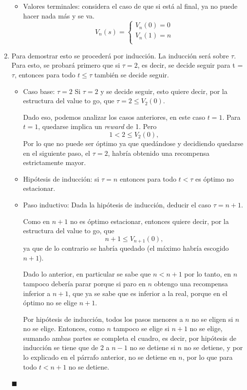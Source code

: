 \documentclass[letterpaper,10pt]{article}
\begin{document}
\begin{enumerate}
\begin{itemize}
        \item Valores terminales: considera el caso de que si está al final, ya no puede hacer nada más y se va.
        \[
        V_n(s) = 
            \begin{cases}
                V_n(0) = 0\\
                V_n(1) = n\\
            \end{cases}
        \]
    \end{itemize}
    
    \item Para demostrar esto se procederá por inducción. La inducción será sobre $\tau$. Para esto, se probará primero que si $\tau = 2$, es decir, se decide seguir para t = $\tau$, entonces para todo $t \leq \tau$ también se decide seguir.
    
    \begin{itemize}
        \item Caso base: $\tau = 2$
            Si $\tau = 2$ y se decide seguir, esto quiere decir, por la estructura del value to go, que $\tau = 2 \leq V_2(0)$.
            
            Dado eso, podemos analizar los casos anteriores, en este caso $t = 1$. Para $t=1$, quedarse implica un \textit{reward} de 1. Pero
            $$1 < 2 \leq V_2(0),$$
            Por lo que no puede ser óptimo ya que quedándose y decidiendo quedarse en el siguiente paso, el $\tau = 2$, habría obtenido una recompensa estrictamente mayor.
            
        \item Hipótesis de inducción: si $\tau = n$ entonces para todo $t < \tau$ es óptimo no estacionar.
        
        \item Paso inductivo: Dada la hipótesis de inducción, deducir el caso $\tau = n + 1$.
        
        Como en $n+1$ no es óptimo estacionar, entonces quiere decir, por la estructura del value to go, que $$n+1 \leq V_{n+1}(0),$$ ya que de lo contrario se habría quedado (el máximo habría escogido $n+1$).
        
        Dado lo anterior, en particular se sabe que $n < n+1$ por lo tanto, en $n$ tampoco debería parar porque si paro en $n$ obtengo una recompensa inferior a $n+1$, que ya se sabe que es inferior a la real, porque en el óptimo no se elige $n+1$.
        
        Por hipótesis de inducción, todos los pasos menores a $n$ no se eligen si $n$ no se elige. Entonces, como $n$ tampoco se elige si $n+1$ no se elige, sumando ambas partes se completa el cuadro, es decir, por hipótesis de inducción se tiene que de 2 a $n - 1$ no se detiene si $n$ no se detiene, y por lo explicado en el párrafo anterior, no se detiene en $n$, por lo que para todo $t<n+1$ no se detiene.
    \end{itemize}
    \begin{flushright} $\blacksquare$ \end{flushright}
    

\end{enumerate}
\end{document}
